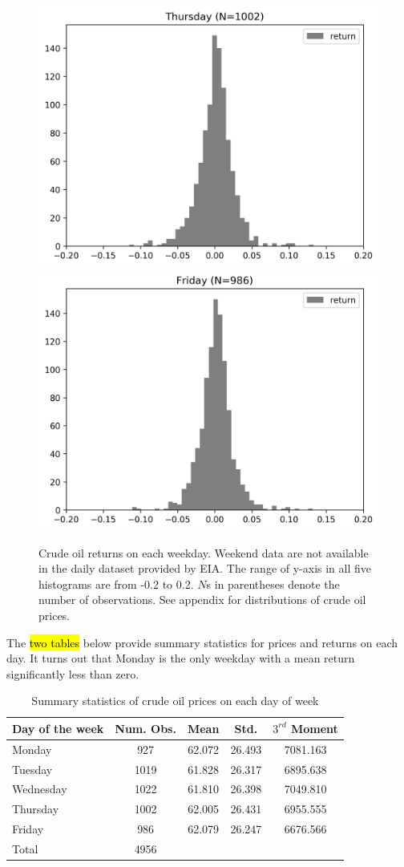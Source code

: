 \documentclass[12pt]{article}
\begin{document}
\begin{figure}[H]
		\includegraphics[width=0.45\linewidth]{figures/day_of_week_effect/dist_returns_Thursday.png}
		\includegraphics[width=0.45\linewidth]{figures/day_of_week_effect/dist_returns_Friday.png}
		\caption{Crude oil returns on each weekday. Weekend data are not available in the daily dataset provided by EIA. The range of y-axis in all five histograms are from -0.2 to 0.2. $N$s in parentheses denote the number of observations. See appendix for distributions of crude oil prices.}
	\end{figure}

	\par The \hl{two tables} below provide summary statistics for prices and returns on each day. It turns out that Monday is the only weekday with a mean return significantly less than zero.
	\begin{table}[H]
		\small
		\centering
		\begin{tabular}{l|c c c c}
			\toprule
			Day of the week & Num. Obs. & Mean & Std. & $3^{rd}$ Moment \\
			\midrule
			Monday & 927 & 62.072 & 26.493 & 7081.163 \\
			Tuesday & 1019 & 61.828 & 26.317 & 6895.638 \\
			Wednesday & 1022 & 61.810 & 26.398 & 7049.810 \\
			Thursday & 1002 & 62.005 & 26.431 & 6955.555 \\
			Friday & 986 & 62.079 & 26.247 & 6676.566 \\
			\midrule
			Total & 4956 & & & \\
			\bottomrule
		\end{tabular}
		\caption{Summary statistics of crude oil prices on each day of week}
	\end{table}
\end{document}
